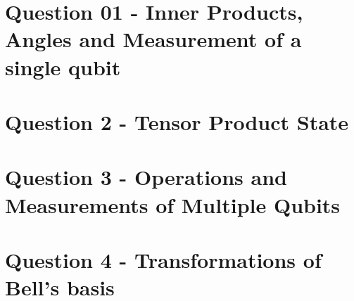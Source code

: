 \documentclass[titlepage]{article}
\begin{document}
    \makemytitle


    \section*{Question 01 -  Inner Products, Angles and Measurement of a single qubit}
    

    \section*{Question 2 - Tensor Product State}
    

    \section*{Question 3 - Operations and Measurements of Multiple Qubits}
    

    \section*{Question 4 - Transformations of Bell’s basis}
    
\end{document}
